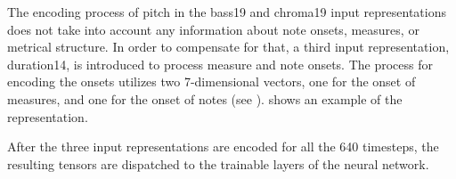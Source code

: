 
The encoding process of pitch in the \gls{bass19} and
\gls{chroma19} input representations does not take into
account any information about note onsets, measures, or
metrical structure. In order to compensate for that, a third
input representation, \gls{duration14}, is introduced to
process measure and note onsets. The process for encoding
the onsets utilizes two 7-dimensional vectors, one for the
onset of measures, and one for the onset of notes (see
). 
shows an example of the representation.


After the three input representations are encoded for all
the 640 timesteps, the resulting tensors are dispatched to
the trainable layers of the neural network.
